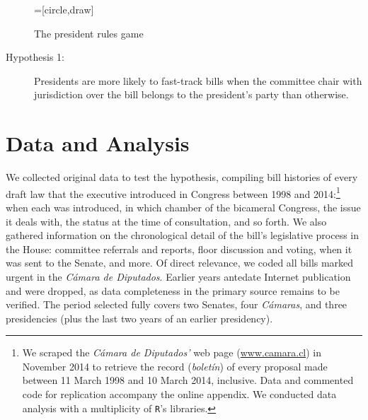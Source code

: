 \documentclass[letter,12pt]{article}
\begin{document}
\begin{figure}
  \centering
    \caption{The president rules game}\label{F:game}
    =[circle,draw]
\end{figure}

\begin{description}
  \item [Hypothesis 1:] Presidents are more likely to fast-track bills when the committee chair with jurisdiction over the bill  belongs to the president's party than otherwise.
\end{description}

\section*{Data and Analysis}

We collected original data to test the hypothesis, compiling bill histories of every draft law that the executive introduced in Congress between 1998 and 2014:\footnote{We scraped the \emph{C\'amara de Diputados'} web page (\url{www.camara.cl}) in November 2014 to retrieve the record (\emph{bolet\'in}) of every proposal made between 11 March 1998 and 10 March 2014, inclusive. Data and commented code for replication accompany the online appendix. We conducted data analysis with a multiplicity of \texttt{R}'s libraries.} when each was introduced, in which chamber of the bicameral Congress, the issue it deals with, the status at the time of consultation, and so forth. We also gathered information on the chronological detail of the bill's legislative process in the House: committee referrals and reports, floor discussion and voting, when it was sent to the Senate, and more. Of direct relevance, we coded all bills marked urgent in the \emph{C\'amara de Diputados}. Earlier years antedate Internet publication and were dropped, as data completeness in the primary source remains to be verified. The period selected fully covers two Senates, four \emph{C\'amaras}, and three presidencies (plus the last two years of an earlier presidency).
\end{document}
